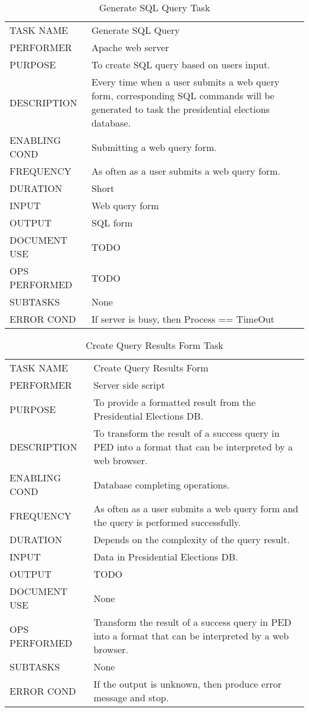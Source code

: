 \documentclass{article}
\begin{document}
\begin{table}[h!]
  \centering
  \caption{Generate SQL Query Task}
  \label{tab:table6}
  \begin{tabular}{lp{10cm}}
       \hline
     TASK NAME & Generate SQL Query\\
     PERFORMER & Apache web server\\
     PURPOSE & To create SQL query based on users input.\\
     DESCRIPTION & Every time when a user submits a web query form, corresponding SQL commands will be generated to task the presidential elections database.\\
     ENABLING COND & Submitting a web query form.\\
     FREQUENCY & As often as a user submits a web query form.\\
     DURATION & Short\\
     INPUT & Web query form\\
     OUTPUT & SQL form\\
     DOCUMENT USE & {\color{red}TODO}\\
     OPS PERFORMED &  {\color{red}TODO}\\
     SUBTASKS & None\\
     ERROR COND &  If server is busy, then Process == TimeOut\\
       \hline
  \end{tabular}
\end{table}

\begin{table}[h!]
  \centering
  \caption{Create Query Results Form Task}
  \label{tab:table7}
  \begin{tabular}{lp{10cm}}
       \hline
     TASK NAME & Create Query Results Form\\
     PERFORMER & Server side script\\
     PURPOSE & To provide a formatted result from the Presidential Elections DB.\\
     DESCRIPTION & To transform the result of a success query in PED into a format that can be interpreted by a web browser.\\
     ENABLING COND & Database completing operations.\\
     FREQUENCY & As often as a user submits a web query form and the query is performed successfully.\\
     DURATION & Depends on the complexity of the query result.\\
     INPUT & Data in Presidential Elections DB.\\
     OUTPUT &  {\color{red}TODO}\\
     DOCUMENT USE & None\\
     OPS PERFORMED &  Transform the result of a success query in PED into a format that can be interpreted by a web browser.\\
     SUBTASKS & None\\
     ERROR COND &  If the output is unknown, then produce error message and stop.\\
       \hline
  \end{tabular}
\end{table}
\end{document}
